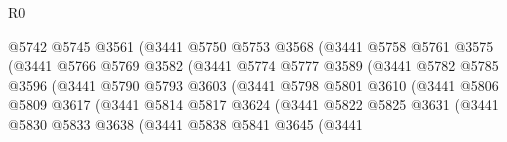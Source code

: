 \begin{lexlean}{R0}
\begin{coremodule}
                                @5742
                                @5745
                                @3561
                                (@3441
                                  @5750
                                  @5753
                                  @3568
                                  (@3441
                                    @5758
                                    @5761
                                    @3575
                                    (@3441
                                      @5766
                                      @5769
                                      @3582
                                      (@3441
                                        @5774
                                        @5777
                                        @3589
                                        (@3441
                                          @5782
                                          @5785
                                          @3596
                                          (@3441
                                            @5790
                                            @5793
                                            @3603
                                            (@3441
                                              @5798
                                              @5801
                                              @3610
                                              (@3441
                                                @5806
                                                @5809
                                                @3617
                                                (@3441
                                                  @5814
                                                  @5817
                                                  @3624
                                                  (@3441
                                                    @5822
                                                    @5825
                                                    @3631
                                                    (@3441
                                                      @5830
                                                      @5833
                                                      @3638
                                                      (@3441
                                                        @5838
                                                        @5841
                                                        @3645
                                                        (@3441

\end{coremodule}
\end{lexlean}
